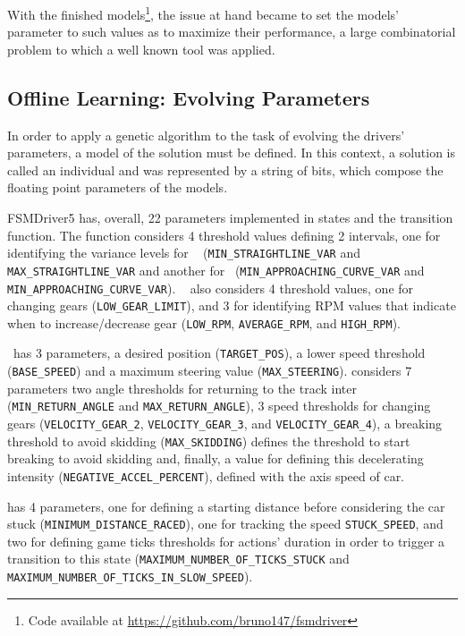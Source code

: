 With the finished models\footnote{Code available at \url{https://github.com/bruno147/fsmdriver}}, the issue at hand became to set the models' parameter to such values as to maximize their performance, a large combinatorial problem to which a well known tool was applied.

\subsection{Offline Learning: Evolving Parameters}%
In order to apply a genetic algorithm to the task of evolving the drivers' parameters, a model of the solution must be defined. In this context, a solution is called an individual and was represented by a string of bits, which compose the floating point parameters of the models.

FSMDriver5 has, overall, 22 parameters implemented in states and the transition function. The function considers 4 threshold values defining 2 intervals, one for identifying the variance levels for \SL~ (\texttt{MIN\_STRAIGHTLINE\_VAR} and \texttt{MAX\_STRAIGHTLINE\_VAR} and another for \AC~(\texttt{MIN\_APPROACHING\_CURVE\_VAR} and \texttt{MIN\_APPROACHING\_CURVE\_VAR}). \SL~ also considers 4 threshold values, one for changing gears (\texttt{LOW\_GEAR\_LIMIT}), and 3 for identifying RPM values that indicate when to increase/decrease gear (\texttt{LOW\_RPM}, \texttt{AVERAGE\_RPM}, and \texttt{HIGH\_RPM}).

\AC~has 3 parameters, a desired position  (\texttt{TARGET\_POS}), a lower speed threshold (\texttt{BASE\_SPEED}) and a maximum steering value (\texttt{MAX\_STEERING}). \OT considers 7 parameters two angle thresholds for returning to the track inter (\texttt{MIN\_RETURN\_ANGLE} and \texttt{MAX\_RETURN\_ANGLE}), 3 speed thresholds for changing gears (\texttt{VELOCITY\_GEAR\_2}, \texttt{VELOCITY\_GEAR\_3}, and \texttt{VELOCITY\_GEAR\_4}), a breaking threshold to avoid skidding (\texttt{MAX\_SKIDDING}) defines the threshold to start breaking to avoid skidding and, finally, a value for defining this decelerating intensity (\texttt{NEGATIVE\_ACCEL\_PERCENT}), defined with the axis speed of car.

\St has 4 parameters, one for defining a starting distance before considering the car stuck (\texttt{MINIMUM\_DISTANCE\_RACED}), one for tracking the speed \texttt{STUCK\_SPEED}, and two for defining game ticks thresholds for actions' duration in order to trigger a transition to this state (\texttt{MAXIMUM\_NUMBER\_OF\_TICKS\_STUCK} and \texttt{MAXIMUM\_NUMBER\_OF\_TICKS\_IN\_SLOW\_SPEED}).

